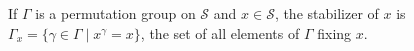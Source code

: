 If $\Gamma$ is a permutation group on $\mathcal{S}$ and $x \in \mathcal{S}$, the stabilizer of $x$ is $\Gamma_x = \{\gamma \in \Gamma \mid x^\gamma = x\}$, the set of all elements of $\Gamma$ fixing $x$.
